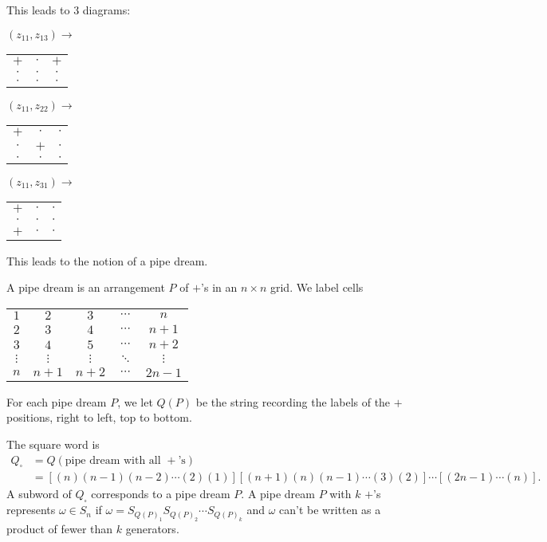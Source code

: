 \begin{example}
This leads to $3$ diagrams:
\begin{center}
    $(z_{11}, z_{13}) \rightarrow$
    \begin{tabular}{ | c c c }
    \hline
    $+$ & $\cdot$ & $+$ \\
    $\cdot$ & $\cdot$ & $\cdot$ \\
    $\cdot$ & $\cdot$ & $\cdot$ 
    \end{tabular}
\end{center}
\begin{center}
    $(z_{11}, z_{22}) \rightarrow$
    \begin{tabular}{ | c c c }
    \hline
    $+$ & $\cdot$ & $\cdot$ \\
    $\cdot$ & $+$ & $\cdot$ \\
    $\cdot$ & $\cdot$ & $\cdot$ 
    \end{tabular}
\end{center}
\begin{center}
    $(z_{11}, z_{31}) \rightarrow$
    \begin{tabular}{ | c c c }
    \hline
    $+$ & $\cdot$ & $\cdot$ \\
    $\cdot$ & $\cdot$ & $\cdot$ \\
    $+$ & $\cdot$ & $\cdot$ 
    \end{tabular}
\end{center}
\end{example}

This leads to the notion of a pipe dream.

\begin{definition}
    A pipe dream is an arrangement $P$ of $+$'s in an $n\times n$ grid. We label cells
\begin{center}
    \begin{tabular}{ | c c c c c}
    \hline
    $1$ & $2$ & $3$ & $\cdots$ & $n$ \\
    $2$ & $3$ & $4$ & $\cdots$ & $n+1$ \\
    $3$ & $4$ & $5$ & $\cdots$ & $n+2$ \\
    $\vdots$ & $\vdots$ & $\vdots$ & $\ddots$ & $$\vdots$$ \\
    $n$ & $n+1$ & $n+2$ & $\cdots$ & $2n-1$
    \end{tabular}
\end{center}
For each pipe dream $P$, we let $Q(P)$ be the string recording the labels of the $+$ positions, right to left, top to bottom.
\end{definition}

\begin{definition}
    The square word is 
    \begin{align*}
        Q_\square &= Q(\text{pipe dream with all $+$'s})\\
        &= [(n)(n-1) (n-2) \cdots (2) (1)] [ (n+1) (n) (n-1) \cdots (3) (2)] \cdots [(2n-1) \cdots (n)].
    \end{align*}
    A subword of $Q_\square$ corresponds to a pipe dream $P$. A pipe dream $P$ with $k$ $+$'s represents $\omega \in S_n$ if $\omega = S_{Q(P)_1} S_{Q(P)_2} \cdots S_{Q(P)_k} $ and $\omega$ can't be written as a product of fewer than $k$ generators.
\end{definition}

